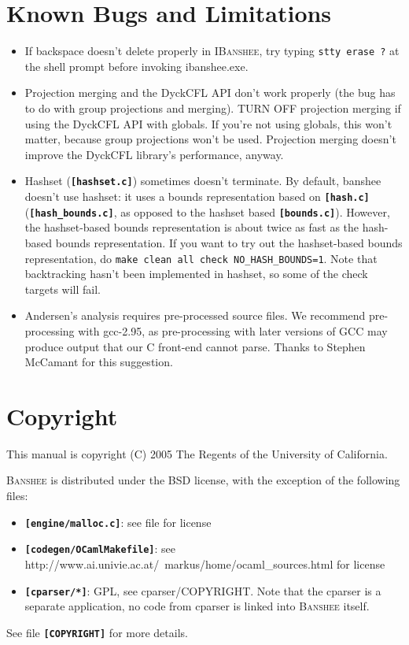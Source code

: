 \documentclass[10pt]{article}
\newcommand{\banshee}{\textsc{Banshee}}
\newcommand{\ibanshee}{\textsc{IBanshee}}
\newcommand{\file}[1]{\texttt{\textbf{[#1]}}}
\begin{document}
\section{Known Bugs and Limitations}
\label{app-bugs}

\begin{itemize}

\item If backspace doesn't delete properly in \ibanshee{}, try typing
  \texttt{stty erase ?} at the shell prompt before invoking
  ibanshee.exe.

\item Projection merging and the DyckCFL API don't work properly (the
  bug has to do with group projections and merging). TURN OFF
  projection merging if using the DyckCFL API with globals. If you're
  not using globals, this won't matter, because group projections
  won't be used. Projection merging doesn't improve the DyckCFL
  library's performance, anyway.

\item Hashset (\file{hashset.c}) sometimes doesn't terminate. By
  default, banshee doesn't use hashset: it uses a bounds
  representation based on \file{hash.c} (\file{hash\_bounds.c}, as
  opposed to the hashset based \file{bounds.c}). However, the
  hashset-based bounds representation is about twice as fast as the
  hash-based bounds representation. If you want to try out the
  hashset-based bounds representation, do \texttt{make clean all check
    NO\_HASH\_BOUNDS=1}. Note that backtracking hasn't been
  implemented in hashset, so some of the check targets will fail.

\item Andersen's analysis requires pre-processed source files. We
  recommend pre-processing with gcc-2.95, as pre-processing with later
  versions of GCC may produce output that our C front-end cannot
  parse. Thanks to Stephen McCamant for this suggestion.

\end{itemize}

\section{Copyright}
\label{app-copyright}

This manual is copyright (C) 2005 The Regents of the University of
California.

\banshee{} is distributed under the BSD license, with the exception of
the following files:

\begin{itemize}
\item \file{engine/malloc.c}: see file for license
\item \file{codegen/OCamlMakefile}: see
  http://www.ai.univie.ac.at/~markus/home/ocaml\_sources.html for
  license
\item \file{cparser/*}: GPL, see cparser/COPYRIGHT. Note that the
  cparser is a separate application, no code from cparser is linked
  into \banshee{} itself.
\end{itemize}

See file \file{COPYRIGHT} for more details.
\end{document}
